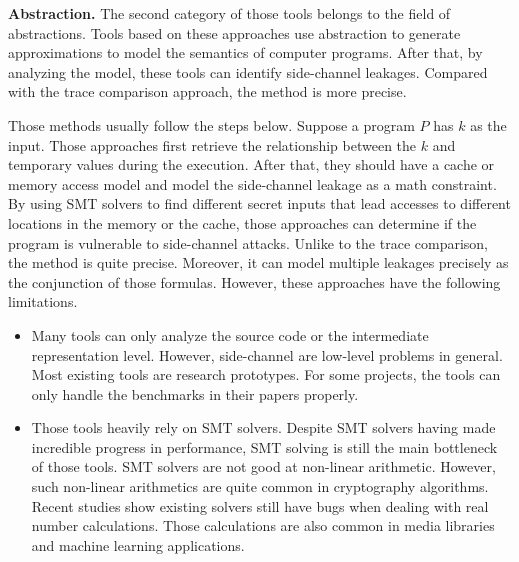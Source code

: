 \textbf{Abstraction.} The second category of those tools belongs to the field of abstractions. Tools based on these approaches use abstraction to generate approximations to model the semantics of computer programs. After that, by analyzing the model, these tools can identify side-channel leakages. Compared with the trace comparison approach, the method is more precise.

Those methods usually follow the steps below. Suppose a program $P$ has $k$ as the input. Those approaches first retrieve the relationship between the $k$ and temporary values during the execution. After that, they should have a cache or memory access model and model the side-channel leakage as a math constraint. By using SMT solvers to find different secret inputs that lead accesses to different locations in the memory or the cache, those approaches can determine if the program is vulnerable to side-channel attacks.
Unlike to the trace comparison, the method is quite precise. Moreover, it can model multiple leakages precisely as the conjunction of those formulas. However, these approaches have the following limitations.

\begin{itemize}
    \item Many tools can only analyze the source code or the intermediate representation level. However, side-channel are low-level problems in general.  Most existing tools are research prototypes. For some projects, the tools can only handle the benchmarks in their papers properly. 
    \item Those tools heavily rely on SMT solvers. Despite SMT solvers having made incredible progress in performance, SMT solving is still the main bottleneck of those tools. SMT solvers are not good at non-linear arithmetic. However, such non-linear arithmetics are quite common in cryptography algorithms.  Recent studies show existing solvers still have bugs when dealing with real number calculations. Those calculations are also common in media libraries and machine learning applications.
\end{itemize}

